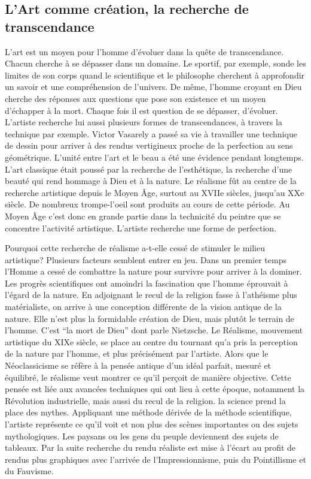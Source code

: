\subsection{L'Art comme création, la recherche de transcendance} 
\xspace

	L’art est un moyen pour l'homme d'évoluer dans la quête de transcendance. Chacun cherche à se dépasser dans un domaine. Le sportif, par exemple, sonde les limites de son corps quand le scientifique et le philosophe cherchent à approfondir un savoir et une compréhension de l'univers. De même, l'homme croyant en Dieu cherche des réponses aux questions que pose son existence et un moyen d'échapper à la mort. Chaque fois il est question de se dépasser, d'évoluer. L'artiste recherche lui aussi plusieurs formes de transcendances, à travers la technique par exemple. Victor Vasarely a passé sa vie à travailler une technique de dessin pour arriver à des rendus vertigineux proche de la perfection au sens géométrique.
L'unité entre l'art et le beau a été une évidence pendant longtemps. L'art classique était poussé par la recherche de l'esthétique, la recherche d'une beauté qui rend hommage à Dieu et à la nature. Le réalisme fût au centre de la recherche artistique depuis le Moyen Âge, surtout au XVIIe siècles, jusqu'au XXe siècle. De nombreux trompe-l'oeil sont produits au cours de cette période. Au Moyen Âge c'est donc en grande partie dans la technicité du peintre que se concentre l'activité artistique. L'artiste recherche une forme de perfection.

\xspace
	Pourquoi cette recherche de réalisme a-t-elle cessé de stimuler le milieu artistique? Plusieurs facteurs semblent entrer en jeu. Dans un premier temps l'Homme a cessé de combattre la nature pour survivre pour arriver à la dominer. Les progrès scientifiques ont amoindri la fascination que l'homme éprouvait à l'égard de la nature. En adjoignant le recul de la religion fasse à l'athéisme plus matérialiste, on arrive à une conception différente de la vision antique de la nature. Elle n'est plus la formidable création de Dieu, mais plutôt le terrain de l'homme. C'est “la mort de Dieu” dont parle Nietzsche. Le Réalisme, mouvement artistique du XIXe siècle, se place au centre du tournant qu'a pris la perception de la nature par l'homme, et plus précisément par l'artiste. Alors que le Néoclassicisme se réfère à la pensée antique d'un idéal parfait, mesuré et équilibré,  le réalisme veut montrer ce qu'il perçoit de manière objective.  Cette pensée est liée aux avancées techniques qui ont lieu à cette époque, notamment la Révolution industrielle, mais aussi du recul de la religion. la 
science prend la place des mythes. Appliquant une méthode dérivée de la méthode scientifique, l'artiste représente ce qu'il voit et non plus des scènes importantes ou des sujets mythologiques. Les paysans ou les gens du peuple deviennent des sujets de tableaux. Par la suite recherche du rendu réaliste est mise à l'écart au profit de rendus plus graphiques avec l'arrivée de l'Impressionnisme, puis du Pointillisme et du Fauvisme.

